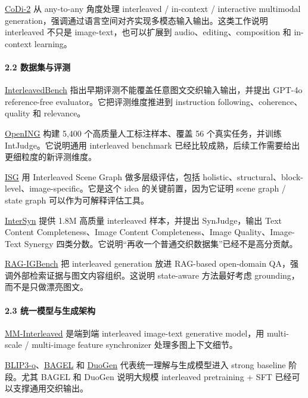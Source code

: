 \href{https://arxiv.org/abs/2311.18775}{CoDi-2} 从 any-to-any 角度处理 interleaved / in-context / interactive multimodal generation，强调通过语言空间对齐实现多模态输入输出。这类工作说明 interleaved 不只是 image-text，也可以扩展到 audio、editing、composition 和 in-context learning。

\paragraph{2.2 数据集与评测}

\href{https://arxiv.org/abs/2406.14643}{InterleavedBench} 指出早期评测不能覆盖任意图文交织输入输出，并提出 GPT-4o reference-free evaluator。它把评测维度推进到 instruction following、coherence、quality 和 relevance。

\href{https://arxiv.org/abs/2411.18499}{OpenING} 构建 5,400 个高质量人工标注样本、覆盖 56 个真实任务，并训练 IntJudge。它说明通用 interleaved benchmark 已经比较成熟，后续工作需要给出更细粒度的新评测维度。

\href{https://arxiv.org/abs/2411.17188}{ISG} 用 Interleaved Scene Graph 做多层级评估，包括 holistic、structural、block-level、image-specific。它是这个 idea 的关键前置，因为它证明 scene graph / state graph 可以作为可解释评估工具。

\href{https://arxiv.org/abs/2506.09427}{InterSyn} 提供 1.8M 高质量 interleaved 样本，并提出 SynJudge，输出 Text Content Completeness、Image Content Completeness、Image Quality、Image-Text Synergy 四类分数。它说明“再收一个普通交织数据集”已经不是高分贡献。

\href{https://arxiv.org/abs/2512.05119}{RAG-IGBench} 把 interleaved generation 放进 RAG-based open-domain QA，强调外部检索证据与图文内容组织。这说明 state-aware 方法最好考虑 grounding，而不是只做漂亮图文。

\paragraph{2.3 统一模型与生成架构}

\href{https://arxiv.org/abs/2401.10208}{MM-Interleaved} 是端到端 interleaved image-text generative model，用 multi-scale / multi-image feature synchronizer 处理多图上下文细节。

\href{https://arxiv.org/abs/2505.09568}{BLIP3-o}、\href{https://arxiv.org/abs/2505.14683}{BAGEL} 和 \href{https://arxiv.org/abs/2602.00508}{DuoGen} 代表统一理解与生成模型进入 strong baseline 阶段。尤其 BAGEL 和 DuoGen 说明大规模 interleaved pretraining + SFT 已经可以支撑通用交织输出。

